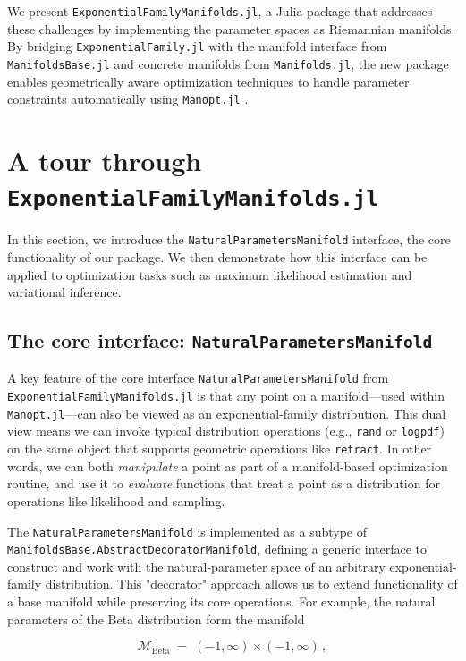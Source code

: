 \documentclass{juliacon}
\begin{document}
We present \texttt{ExponentialFamilyManifolds.jl}, a Julia \cite{bezanson2017julia} package that addresses these challenges by implementing the parameter spaces as Riemannian manifolds. By bridging \texttt{ExponentialFamily.jl} \cite{Senoz_ExponentialFamily_jl_2023} with the manifold interface from \texttt{ManifoldsBase.jl} \cite{axen_manifoldsjl_2023} and concrete manifolds from \texttt{Manifolds.jl}, the new package enables geometrically aware optimization techniques to handle parameter constraints automatically using \texttt{Manopt.jl} \cite{bergmann_manoptjl_2022}.

\section{A tour through \texttt{ExponentialFamilyManifolds.jl}}
In this section, we introduce the \texttt{NaturalParametersManifold} interface, the core functionality of our package. We then demonstrate how this interface can be applied to optimization tasks such as maximum likelihood estimation and variational inference.

\subsection{The core interface: \texttt{NaturalParametersManifold}}

A key feature of the core interface \texttt{NaturalParametersManifold} from \texttt{ExponentialFamilyManifolds.jl} is that any point on a manifold—used within \texttt{Manopt.jl}—can also be viewed as an exponential-family distribution. This dual view means we can invoke typical distribution operations (e.g., \texttt{rand} or \texttt{logpdf}) on the same object that supports geometric operations like \texttt{retract}. In other words, we can both \emph{manipulate} a point as part of a manifold-based optimization routine, and use it to \emph{evaluate} functions that treat a point as a distribution for operations like likelihood and sampling.

The \texttt{NaturalParametersManifold} is implemented as a subtype of \texttt{ManifoldsBase.AbstractDecoratorManifold}, defining a generic interface to construct and work with the natural-parameter space of an arbitrary exponential-family distribution. This "decorator" approach allows us to extend functionality of a base manifold while preserving its core operations. For example, the natural parameters of the Beta distribution form the manifold

\[
\mathcal{M}_{\mathrm{Beta}} \;=\; (-1,\infty) \times (-1,\infty)\,,
\]
\end{document}
